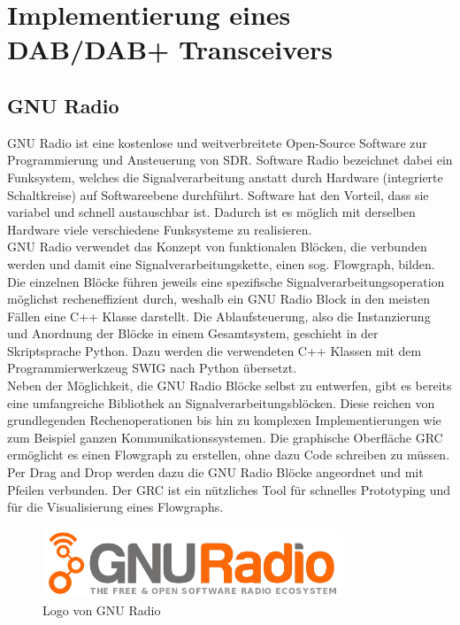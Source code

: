 \chapter{Implementierung eines DAB/DAB+ Transceivers}
\section{GNU Radio}
GNU Radio ist eine kostenlose und weitverbreitete Open-Source Software zur Programmierung und Ansteuerung von \ac{SDR}. Software Radio bezeichnet dabei ein Funksystem, welches die Signalverarbeitung anstatt durch Hardware (integrierte Schaltkreise) auf Softwareebene durchführt. Software hat den Vorteil, dass sie variabel und schnell austauschbar ist. Dadurch ist es möglich mit derselben Hardware viele verschiedene Funksysteme zu realisieren.\\
GNU Radio verwendet das Konzept von funktionalen Blöcken, die verbunden werden und damit eine Signalverarbeitungskette, einen sog. Flowgraph, bilden. Die einzelnen Blöcke führen jeweils eine spezifische Signalverarbeitungsoperation möglichst recheneffizient durch, weshalb ein GNU Radio Block in den meisten Fällen eine C++ Klasse darstellt. Die Ablaufsteuerung, also die Instanzierung und Anordnung der Blöcke in einem Gesamtsystem, geschieht in der Skriptsprache Python. Dazu werden die verwendeten C++ Klassen mit dem Programmierwerkzeug \ac{SWIG} nach Python übersetzt.\\
Neben der Möglichkeit, die GNU Radio Blöcke selbst zu entwerfen, gibt es bereits eine umfangreiche Bibliothek an Signalverarbeitungsblöcken. Diese reichen von grundlegenden Rechenoperationen bis hin zu komplexen Implementierungen wie zum Beispiel ganzen Kommunikationssystemen. Die graphische Oberfläche \ac{GRC} ermöglicht es einen Flowgraph zu erstellen, ohne dazu Code schreiben zu müssen. Per Drag and Drop werden dazu die GNU Radio Blöcke angeordnet und mit Pfeilen verbunden. Der GRC ist ein nützliches Tool für schnelles Prototyping und für die Visualisierung eines Flowgraphs.\\

\begin{figure}[htb]
    \centering
    \includegraphics[width=0.8\textwidth]{figures/Gnuradio_logo.png}
    \caption{Logo von GNU Radio}
    \label{fig:gnu_radio_logo}
\end{figure}

